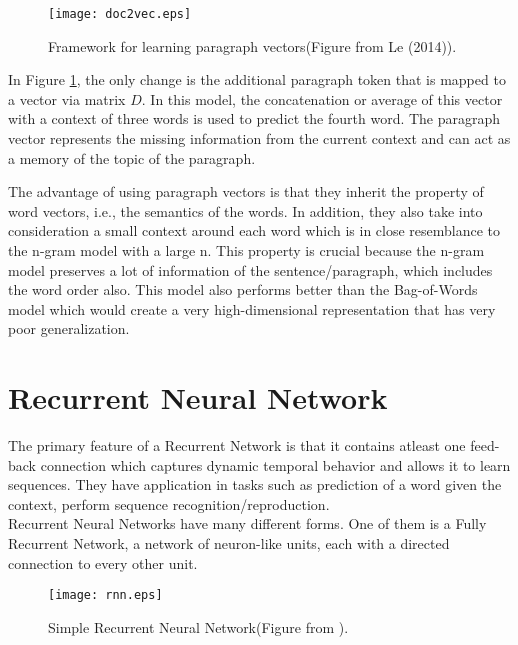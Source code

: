 \begin{figure}[ht!]
\centering
\texttt{[image: doc2vec.eps]}
\caption{Framework for learning paragraph vectors(Figure from Le (2014)). \label{fig:doc2vec}}
\end{figure}
In Figure \ref{fig:doc2vec}, the only change is the additional paragraph token that is mapped to a vector via matrix $D$. In this model, the concatenation or average of this vector with a context of three words is used to predict the fourth word. The paragraph vector represents the missing information from the current context and can act as a memory of the topic of the paragraph.

The advantage of using paragraph vectors is that they inherit the property of word vectors, i.e., the semantics of the words. In addition, they also take into consideration a small context around each word which is in close resemblance to the n-gram model with a large n. This property is crucial because the n-gram model preserves a lot of information of the sentence/paragraph, which includes the word order also. This model also performs better than the Bag-of-Words model which would create a very high-dimensional representation that has very poor generalization.

\section{Recurrent Neural Network}
\label{sec:rnn}
The primary feature of a Recurrent Network is that it contains atleast one feed-back connection which captures dynamic temporal behavior and allows it to learn sequences. They have application in tasks such as prediction of a word given the context, perform sequence recognition/reproduction.\\
Recurrent Neural Networks have many different forms. One of them is a Fully Recurrent Network, a network of neuron-like units, each with a directed connection to every other unit.\\
\begin{figure}[ht!]
\centering
\texttt{[image: rnn.eps]}
\caption{Simple Recurrent Neural Network(Figure from \cite{Mikolov:10}). \label{fig:rnn}}
\end{figure}

